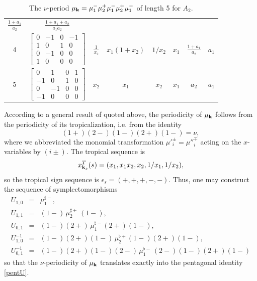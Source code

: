 \documentclass[12pt,reqno]{article}
\numberwithin{equation}{section}
\newcommand{\be}{\begin{equation}}
\newcommand{\ee}{\end{equation}}
\newcommand{\beq}{\begin{eqnarray}}
\newcommand{\eeq}{\end{eqnarray}}
\newcommand{\bfk}{{\bf k}}
\newcommand{\nn}{\nonumber}
\def\ind{s}
\numberwithin{equation}{section}
\begin{document}
\begin{table}[htb]
\begin{center}
\begin{tabular}{|c||c||c|c||c|c||c|c||}
$\frac{1+a_1}{a_2} $&$ \frac{1+a_1+a_2}{a_1 a_2}$ \\
4&
{\scriptsize
$\left[
\begin{array}{cccc}
 0 & -1 & 0 & -1 \\
 1 & 0 & 1 & 0 \\
 0 & -1 & 0 & 0 \\
 1 & 0 & 0 & 0
\end{array}
\right]$}
&$\frac{1}{x_2}$ & $x_1(1+x_2) $&$  1/x_2 $& $x_1$ &$ \frac{1+a_1}{a_2} $& $a_1$ \\
5&
{\scriptsize
$\left[
\begin{array}{cccc}
 0 & 1 & 0 & 1 \\
 -1 & 0 & 1 & 0 \\
 0 & -1 & 0 & 0 \\
 -1 & 0 & 0 & 0
\end{array}
\right]$}
&$x_2 $&$ x_1$ & $  x_2$ &$ x_1$ & $a_2$ &$ a_1$\\
\hline
\end{tabular}
\end{center}
\caption{The $\nu$-period $\mu_{\bfk}=
\mu_1^- \mu_2^+ \mu_1^-  \mu_2^+ \mu_1^-$ of length 5 for $A_2$.}
\label{A2table}
\end{table}
According to a general result of \cite{Keller:2010,Plamondon:2010}
quoted above, the periodicity of $\mu_{\bfk}$
follows from the periodicity of its tropicalization, i.e. from the identity
\be
(1+)(2-)(1-)(2+)(1-)=\nu  ,
\ee
where we abbreviated the monomial transformation $\mu'^{\pm}_i=\mu''^{\mp}_i$
acting on the $x$-variables by $(i\pm)$.
The tropical sequence is
\be
x^{T}_{{\bf k}_\ind}(\ind) = (x_1,x_1 x_2,x_2,1/x_1,1/x_2),
\ee
so the
tropical sign sequence is  $\epsilon_\ind=(+,+,+,-,-)$.
Thus, one may construct the sequence of symplectomorphisms
\beq
U_{1,0}&=& \mu_1^{\sharp -} ,
\nn\\
U_{1,1} &=& (1-)\, \mu_2^{\sharp +}\, (1-),
\nn \\
U_{0,1}&=&(1-)(2+)\, \mu_1^{\sharp -}  (2+)(1-),
\\
U_{1,0}^{-1} &=&  (1-)(2+)(1-)\, \mu_2^{\flat +} (1-)(2+)(1-),
\nn \\
U_{0,1}^{-1} &=& (1-)(2+)(1-)(2-) \, \mu_1^{\flat -}\, (2-)(1-)(2+)(1-) \nn
\eeq
so that the $\nu$-periodicity of $\mu_{\bfk}$
translates exactly into the pentagonal identity \eqref{pentU}.
\end{document}
